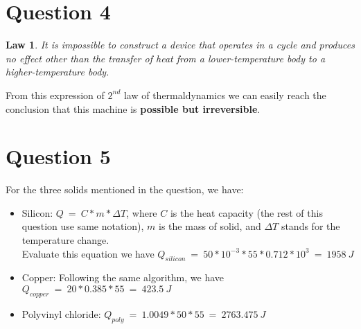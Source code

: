 \documentclass[12pt]{article}
\newtheorem{Law}{Law}
\begin{document}
\section{Question 4}
\label{sec:question-4}

\begin{Law}
  It is impossible to construct a device that operates in a cycle and
  produces no effect other than the transfer of heat from a
  lower-temperature body to a higher-temperature body. 
\end{Law}
From this expression of $2^{nd}$ law of thermaldynamics we can easily
reach the conclusion that this machine is \textbf{possible but
  irreversible}.

\section{Question 5}
\label{sec:question-5}

For the three solids mentioned in the question, we have:
\begin{itemize}
\item Silicon: $Q~=~C*m*\Delta T$, where $C$ is the heat capacity (the
  rest of this question use same notation), $m$ is the mass of solid,
  and $\Delta T$ stands for the temperature change.\\
  Evaluate this equation we have
  $Q_{silicon}~=~50*10^{-3}*55*0.712*10^{3}~=~1958~J$
\item Copper: Following the same algorithm, we have
  $Q_{copper}~=~20*0.385*55~=~423.5~J$
\item Polyvinyl chloride: $Q_{poly}~=~1.0049*50*55~=~2763.475~J$
\end{itemize}
\end{document}
